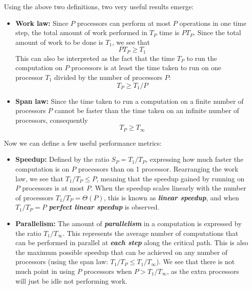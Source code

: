 \documentclass[bsc,frontabs,singlespacing,parskip,deptreport,normalheadings]{infthesis}
\begin{document}
Using the above two definitions, two very useful results emerge:

\begin{itemize}
    \item \textbf{Work law:} Since \(P\) processors can perform at most
        \(P\) operations in one time step, the total amount of work
        performed in \(T_P\) time is \(P T_P\). Since the total amount of
        work to be done is \(T_1\), we see that \[P T_P \geq T_1\] This can
        also be interpreted as the fact that the time \(T_P\) to run the
        computation on \(P\) processors is at least the time taken to run on
        one processor \(T_1\) divided by the number of processors \(P\):
        \[T_P \geq T_1 / P\]
    \item \textbf{Span law:} Since the time taken to run a computation on a
        finite number of processors \(P\) cannot be faster than the time
        taken on an infinite number of processors, consequently \[T_P \geq
        T_\infty\]
\end{itemize}

Now we can define a few useful performance metrics:

\begin{itemize}
    \item \textbf{Speedup:} Defined by the ratio \(S_P = T_1 / T_P\),
        expressing how much faster the computation is on \(P\) processors
        than on 1 processor. Rearranging the work law, we see that \(T_1 /
        T_P \leq P\), meaning that the speedup gained by running on \(P\)
        processors is at most \(P\). When the speedup scales linearly
        with the number of processors \(T_1 / T_P = \Theta(P)\), this is known
        as \textit{\textbf{linear speedup}}, and when \(T_1 / T_P = P\)
        \textit{\textbf{perfect linear speedup}} is observed.
    \item \textbf{Parallelism:} The amount of \textit{\textbf{parallelism}} in a
        computation is expressed by the ratio \(T_1 / T_\infty\). This
        represents the average number of computations that can be performed
        in parallel at \textit{\textbf{each step}} along the critical path. This is
        also the maximum possible speedup that can be achieved on any number
        of processors (using the span law: \(T_1 / T_P \leq T_1 /
        T_\infty\)). We see that there is not much point in using
        \(P\) processors when \(P > T_1 / T_\infty\), as the extra
        processors will just be idle not performing work.
\end{itemize}
\end{document}
